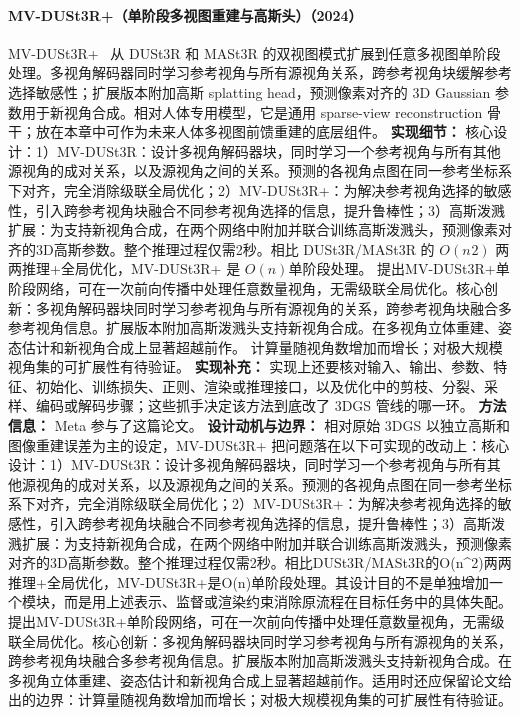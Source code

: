 \paragraph{MV-DUSt3R+（单阶段多视图重建与高斯头）（2024）}
MV-DUSt3R+~\cite{2412_06974} 从 DUSt3R 和 MASt3R 的双视图模式扩展到任意多视图单阶段处理。多视角解码器同时学习参考视角与所有源视角关系，跨参考视角块缓解参考选择敏感性；扩展版本附加高斯 splatting head，预测像素对齐的 3D Gaussian 参数用于新视角合成。相对人体专用模型，它是通用 sparse-view reconstruction 骨干；放在本章中可作为未来人体多视图前馈重建的底层组件。
\textbf{实现细节：} 核心设计：1）MV-DUSt3R：设计多视角解码器块，同时学习一个参考视角与所有其他源视角的成对关系，以及源视角之间的关系。预测的各视角点图在同一参考坐标系下对齐，完全消除级联全局优化；2）MV-DUSt3R+：为解决参考视角选择的敏感性，引入跨参考视角块融合不同参考视角选择的信息，提升鲁棒性；3）高斯泼溅扩展：为支持新视角合成，在两个网络中附加并联合训练高斯泼溅头，预测像素对齐的3D高斯参数。整个推理过程仅需2秒。相比 DUSt3R/MASt3R 的 $O(n^{}2)$ 两两推理+全局优化，MV-DUSt3R+ 是 $O(n)$单阶段处理。 提出MV-DUSt3R+单阶段网络，可在一次前向传播中处理任意数量视角，无需级联全局优化。核心创新：多视角解码器块同时学习参考视角与所有源视角的关系，跨参考视角块融合多参考视角信息。扩展版本附加高斯泼溅头支持新视角合成。在多视角立体重建、姿态估计和新视角合成上显著超越前作。 计算量随视角数增加而增长；对极大规模视角集的可扩展性有待验证。
\textbf{实现补充：} 实现上还要核对输入、输出、参数、特征、初始化、训练损失、正则、渲染或推理接口，以及优化中的剪枝、分裂、采样、编码或解码步骤；这些抓手决定该方法到底改了 3DGS 管线的哪一环。
\textbf{方法信息：} Meta 参与了这篇论文。
\textbf{设计动机与边界：} 相对原始 3DGS 以独立高斯和图像重建误差为主的设定，MV-DUSt3R+ 把问题落在以下可实现的改动上：核心设计：1）MV-DUSt3R：设计多视角解码器块，同时学习一个参考视角与所有其他源视角的成对关系，以及源视角之间的关系。预测的各视角点图在同一参考坐标系下对齐，完全消除级联全局优化；2）MV-DUSt3R+：为解决参考视角选择的敏感性，引入跨参考视角块融合不同参考视角选择的信息，提升鲁棒性；3）高斯泼溅扩展：为支持新视角合成，在两个网络中附加并联合训练高斯泼溅头，预测像素对齐的3D高斯参数。整个推理过程仅需2秒。相比DUSt3R/MASt3R的O(n\^{}2)两两推理+全局优化，MV-DUSt3R+是O(n)单阶段处理。其设计目的不是单独增加一个模块，而是用上述表示、监督或渲染约束消除原流程在目标任务中的具体失配。提出MV-DUSt3R+单阶段网络，可在一次前向传播中处理任意数量视角，无需级联全局优化。核心创新：多视角解码器块同时学习参考视角与所有源视角的关系，跨参考视角块融合多参考视角信息。扩展版本附加高斯泼溅头支持新视角合成。在多视角立体重建、姿态估计和新视角合成上显著超越前作。适用时还应保留论文给出的边界：计算量随视角数增加而增长；对极大规模视角集的可扩展性有待验证。
